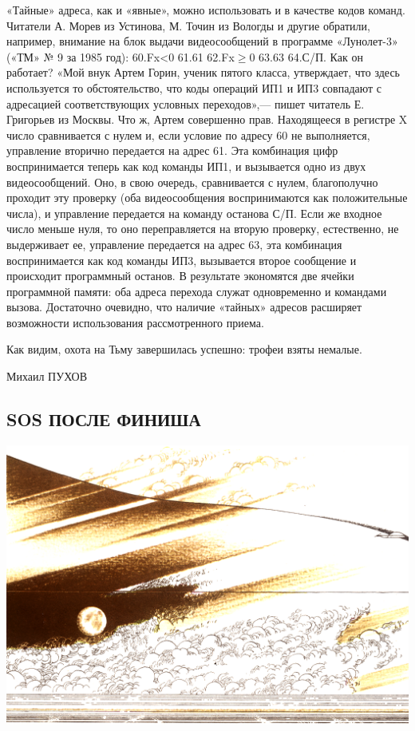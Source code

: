 \documentclass[11pt,a4paper,oneside]{article}
\begin{document}
«Тайные» адреса, как и «явные», можно использовать и в качестве кодов команд. Читатели А. Морев из Устинова, М. Точин из Вологды и другие обратили, например, внимание на блок выдачи видеосообщений в программе «Лунолет-3» («ТМ» № 9 за 1985 год): 60.Fx<0 61.61 62.Fx$\geq$0 63.63 64.С/П. Как он работает? «Мой внук Артем Горин, ученик пятого класса, утверждает, что здесь используется то обстоятельство, что коды операций ИП1 и ИП3 совпадают с адресацией соответствующих условных переходов»,— пишет читатель Е. Григорьев из Москвы. Что ж, Артем совершенно прав. Находящееся в регистре X число сравнивается с нулем и, если условие по адресу 60 не выполняется, управление вторично передается на адрес 61. Эта комбинация цифр воспринимается теперь как код команды ИП1, и вызывается одно из двух видеосообщений. Оно, в свою очередь, сравнивается с нулем, благополучно проходит эту проверку (оба видеосообщения воспринимаются как положительные числа), и управление передается на команду останова С/П. Если же входное число меньше нуля, то оно переправляется на вторую проверку, естественно, не выдерживает ее, управление передается на адрес 63, эта комбинация воспринимается как код команды ИП3, вызывается второе сообщение и происходит программный останов. В результате экономятся две ячейки программной памяти: оба адреса перехода служат одновременно и командами вызова. Достаточно очевидно, что наличие «тайных» адресов расширяет возможности использования рассмотренного приема.

Как видим, охота на Тьму завершилась успешно: трофеи взяты немалые.

Михаил ПУХОВ

\subsection{SOS ПОСЛЕ ФИНИША}
\includegraphics[width=\textwidth]{sos1}
\end{document}
